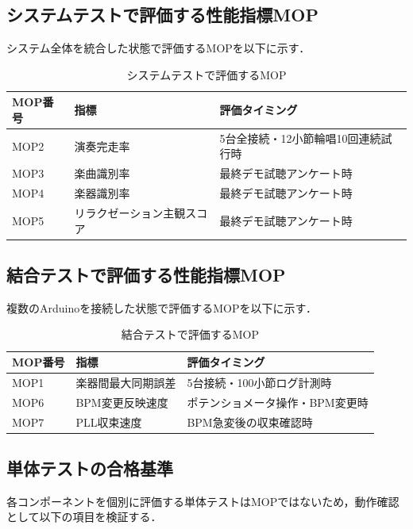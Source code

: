 \documentclass[lualatex,book,paper=a4paper,jafontsize=11.5pt,jafontscale=1.05]{jlreq}
\begin{document}
\clearpage
\subsection{システムテストで評価する性能指標MOP}

システム全体を統合した状態で評価するMOPを以下に示す．

\begin{table}[htbp]
\centering
\caption{システムテストで評価するMOP}
\label{tab:mop_system}
\begin{tabular}{C{1.5cm}L{5cm}L{5cm}}
  \toprule
  \textbf{MOP番号} & \textbf{指標} & \textbf{評価タイミング} \\
  \midrule
  MOP2 & 演奏完走率 & 5台全接続・12小節輪唱10回連続試行時 \\
  MOP3 & 楽曲識別率 & 最終デモ試聴アンケート時 \\
  MOP4 & 楽器識別率 & 最終デモ試聴アンケート時 \\
  MOP5 & リラクゼーション主観スコア & 最終デモ試聴アンケート時 \\
  \bottomrule
\end{tabular}
\end{table}

\subsection{結合テストで評価する性能指標MOP}
複数のArduinoを接続した状態で評価するMOPを以下に示す．

\begin{table}[htbp]
\centering
\caption{結合テストで評価するMOP}
\label{tab:mop_integration}
\begin{tabular}{C{1.5cm}L{5cm}L{5cm}}
  \toprule
  \textbf{MOP番号} & \textbf{指標} & \textbf{評価タイミング} \\
  \midrule
  MOP1 & 楽器間最大同期誤差 & 5台接続・100小節ログ計測時 \\
  MOP6 & BPM変更反映速度 & ポテンショメータ操作・BPM変更時 \\
  MOP7 & PLL収束速度 & BPM急変後の収束確認時 \\
  \bottomrule
\end{tabular}
\end{table}

\subsection{単体テストの合格基準}
各コンポーネントを個別に評価する単体テストはMOPではないため，動作確認として以下の項目を検証する．
\end{document}
